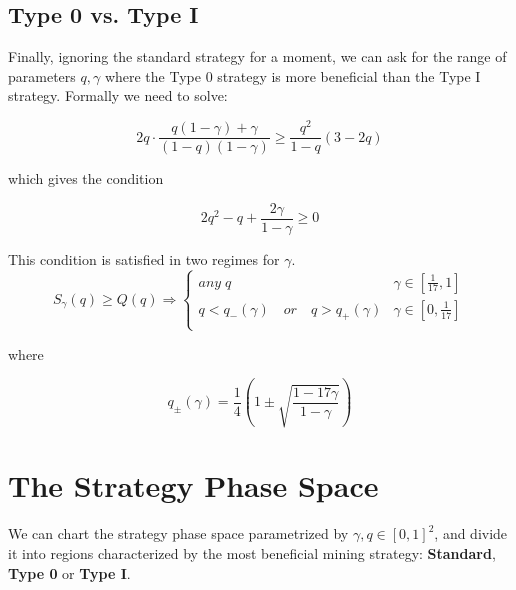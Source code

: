 \documentclass[letterpaper,12pt]{report}
\theoremstyle{plain}
\theoremstyle{definition}
\begin{document}
\subsection{Type 0 vs. Type I}

Finally, ignoring the standard strategy for a moment, we can ask for the range of parameters $q,\gamma$ where the Type 0 strategy is more beneficial than the Type I strategy. Formally we need to solve:

\begin{equation}\label{eq:type0overtype1}
2q\cdot\frac{q(1-\gamma)+\gamma}{(1-q)(1-\gamma)}\geq \dfrac{q^2}{1-q}\left(
3-2q
\right)
\end{equation}

which gives the condition

\begin{equation}\label{eq:type0over1condition}
2q^2-q+\frac{2\gamma}{1-\gamma}\geq 0
\end{equation}

This condition is satisfied in two regimes for $\gamma$.
\begin{equation}\label{eq:type0over1gammaregimes}
S_{\gamma}(q)\geq Q(q) \Longrightarrow
\begin{cases}
\mathit{any\;} q & \gamma\in [\frac{1}{17},1] \\ 
q<q_-(\gamma)\quad \mathit{or}\quad q>q_+(\gamma) & \gamma\in [0,\frac{1}{17}] \\ 
\end{cases}
\end{equation}

where 

\begin{equation}\label{qplusminus}
q_{\pm}(\gamma)=\frac{1}{4}\left(1\pm\sqrt{\frac{1-17\gamma}{1-\gamma}}\right)
\end{equation}


\section{The Strategy Phase Space}\label{sec:phasespace}

We can chart the strategy phase space parametrized by $\gamma,q\in [0,1]^2$, and divide it into regions characterized by the most beneficial mining strategy: \textbf{Standard}, \textbf{Type 0} or \textbf{Type I}.
\end{document}
